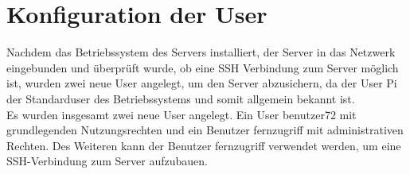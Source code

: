 \documentclass[a4paper, 12pt]{scrartcl}
\begin{document}
\section{Konfiguration der User}\label{ch:user}
Nachdem das Betriebssystem des Servers installiert, der Server in das Netzwerk eingebunden und überprüft wurde, ob eine SSH Verbindung zum Server möglich ist, wurden zwei neue User angelegt, um den Server
abzusichern, da der User \glqq Pi\grqq{} der Standarduser des Betriebssystems und somit allgemein bekannt ist.
\\
Es wurden insgesamt zwei neue User angelegt. Ein User \glqq benutzer72\grqq{} mit grundlegenden Nutzungsrechten und ein Benutzer \glqq fernzugriff\grqq{} mit administrativen Rechten. Des Weiteren kann der
Benutzer \glqq fernzugriff\grqq{} verwendet werden, um eine SSH-Verbindung zum Server aufzubauen.
\end{document}
